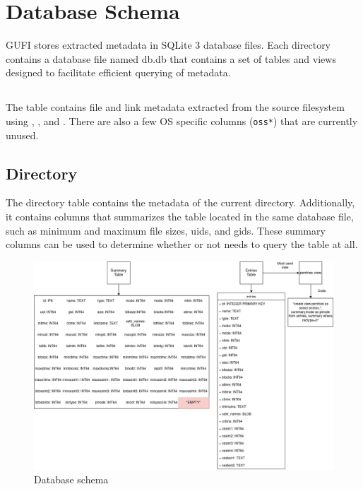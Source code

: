 \section{Database Schema}
\label{sec:schema}
GUFI stores extracted metadata in SQLite 3 database files. Each
directory contains a database file named db.db that contains a set of
tables and views designed to facilitate efficient querying of
metadata.

\subsection{\entries}
The \entries table contains file and link metadata extracted from the
source filesystem using \stat, \readlink, and \listxattr. There are
also a few OS specific columns (\texttt{oss*}) that are currently
unused.

\subsection{Directory \summary}
The directory \summary table contains the metadata of the current
directory. Additionally, it contains columns that summarizes the
\entries table located in the same database file, such as minimum and
maximum file sizes, uids, and gids. These summary columns can be used
to determine whether or not \querydb needs to query the \entries table
at all.

\begin{figure} [h]
\centering
\includegraphics[width=1.0\textwidth]{images/Database_Schemas.png}
\caption{\label{fig:Database Schema}Database schema}
\end{figure}

